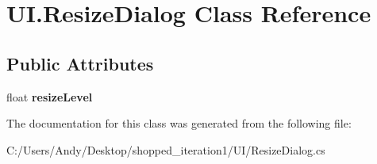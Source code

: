 \hypertarget{class_u_i_1_1_resize_dialog}{
\section{UI.ResizeDialog Class Reference}
\label{class_u_i_1_1_resize_dialog}
}
\subsection*{Public Attributes}
\begin{DoxyCompactItemize}
\item 
\hypertarget{class_u_i_1_1_resize_dialog_a6aaf0afba15857d0469bab9750f681c6}{
float {\bfseries resizeLevel}}
\label{class_u_i_1_1_resize_dialog_a6aaf0afba15857d0469bab9750f681c6}

\end{DoxyCompactItemize}


The documentation for this class was generated from the following file:\begin{DoxyCompactItemize}
\item 
C:/Users/Andy/Desktop/shopped\_\-iteration1/UI/ResizeDialog.cs\end{DoxyCompactItemize}
